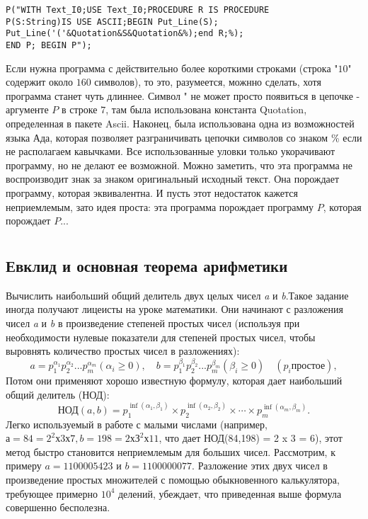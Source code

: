 \begin{lstlisting}[frame=none]
	P("WITH Text_I0;USE Text_I0;PROCEDURE R IS PROCEDURE
P(S:String)IS USE ASCII;BEGIN Put_Line(S);
Put_Line('('&Quotation&S&Quotation&%);end R;%);
END P; BEGIN P");
\end{lstlisting}

Если нужна программа с действительно более короткими строками
(строка "$10$" содержит около $160$ символов), то это, разумеется, можнно сделать, хотя программа станет чуть длиннее. Символ " не может просто появиться в цепочке - аргументе $P$ в строке $7$, там была использована константа Quotation, определенная в пакете Ascii. Наконец, была использована одна из возможностей языка Ада, которая позволяет разграничивать цепочки символов со знаком \% если не располагаем кавычками. Все использованные уловки только укорачивают программу, но не делают ее возможной. Можно заметить, что эта программа не воспроизводит знак за знаком оригинальный исходный текст. Она порождает программу, которая эквивалентна. И пусть этот недостаток кажется неприемлемым, зато идея проста: эта программа порождает программу $P$, которая порождает $P$...

\newpage
\chapter{}
\section{Евклид и основная теорема арифметики}
\noindent Вычислить наибольший общий делитель двух целых чисел {\it a} и {\it b}.Такое задание иногда получают лицеисты на уроке математики. Они начинают с разложения чисел {\it a} и {\it b} в произведение степеней простых чисел (используя при необходимости нулевые показатели для степеней простых чисел, чтобы выровнять количество простых чисел в разложениях): 
\[
 a=p_1^{\alpha_1}p_2^{\alpha_2}...p_m^{\alpha_m} (\alpha_i \geqslant 0), \quad b=p_1^{\beta_1}p_2^{\beta_2}...p_m^{\beta_m} (\beta_i \geqslant 0) \quad (p_i  \text{простое}),
\]
\noindent Потом они применяют хорошо известную формулу, которая дает наибольший общий делитель (НОД): 
\[
\text{НОД}(a,b)=p_1^{\inf (\alpha_1,\beta_1)} \times p_2^{\inf (\alpha_2,\beta_2)} \times \cdots \times p_m^{\inf (\alpha_m,\beta_m)}.
\]
Легко используемый в работе с малыми числами (например, $а = 84 = 2^2 х 3 х 7, b = 198 = 2 х З^2 х 11$, что дает НОД(84,198) = 2 x 3 = 6), этот метод быстро становится неприемлемым для больших чисел. Рассмотрим, к примеру $a = 1 100 005 423$ и $b = 1 100 000 077$. Разложение этих двух чисел в произведение простых множителей с помощью обыкновенного калькулятора, требующее примерно $10^4$ делений, убеждает, что приведенная выше формула совершенно бесполезна.


